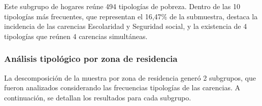 \documentclass[12pt,letterpaper,spanish]{article}
\begin{document}
\begin{itemize}
    Este subgrupo de hogares reúne 494 tipologías de pobreza. Dentro de las 10 tipologías más frecuentes, que representan el 16,47\% de la submuestra, destaca la incidencia de las carencias Escolaridad y Seguridad social, y la existencia de 4 tipologías que reúnen 4 carencias simultáneas.

\end{itemize}

\subsubsection{Análisis tipológico por zona de residencia}
La descomposición de la muestra por zona de residencia generó 2 subgrupos, que fueron analizados considerando las frecuencias tipologías de las carencias. A continuación, se detallan los resultados para cada subgrupo.
\end{document}
